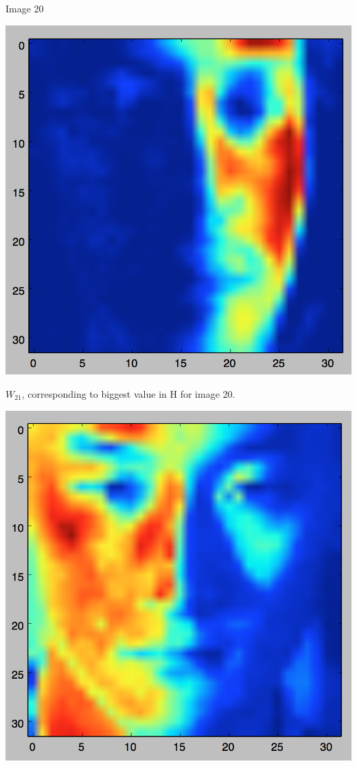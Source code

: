 \documentclass[11pt]{article}
\begin{document}
Image 20

\includegraphics[scale=.5]{images/img20_W21}

$W_{21}$, corresponding to biggest value in H for image 20.

\includegraphics[scale=.5]{images/img500}
\end{document}
